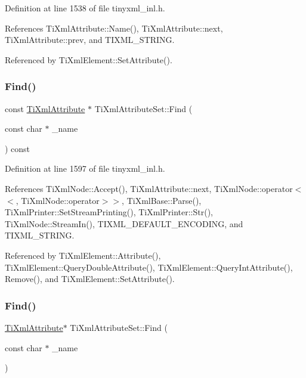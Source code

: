 Definition at line 1538 of file tinyxml\+\_\+inl.\+h.



References Ti\+Xml\+Attribute\+::\+Name(), Ti\+Xml\+Attribute\+::next, Ti\+Xml\+Attribute\+::prev, and T\+I\+X\+M\+L\+\_\+\+S\+T\+R\+I\+NG.



Referenced by Ti\+Xml\+Element\+::\+Set\+Attribute().

\hypertarget{class_ti_xml_attribute_set_a39e9f5ed5ebbf02e059dd39cfa6c5052}{}\label{class_ti_xml_attribute_set_a39e9f5ed5ebbf02e059dd39cfa6c5052} 
\subsubsection{\texorpdfstring{Find()}{Find()}\hspace{0.1cm}{\footnotesize\ttfamily [1/4]}}
{\footnotesize\ttfamily const \hyperlink{class_ti_xml_attribute}{Ti\+Xml\+Attribute} $\ast$ Ti\+Xml\+Attribute\+Set\+::\+Find (\begin{DoxyParamCaption}\item[{const char $\ast$}]{\+\_\+name }\end{DoxyParamCaption}) const}



Definition at line 1597 of file tinyxml\+\_\+inl.\+h.



References Ti\+Xml\+Node\+::\+Accept(), Ti\+Xml\+Attribute\+::next, Ti\+Xml\+Node\+::operator$<$$<$, Ti\+Xml\+Node\+::operator$>$$>$, Ti\+Xml\+Base\+::\+Parse(), Ti\+Xml\+Printer\+::\+Set\+Stream\+Printing(), Ti\+Xml\+Printer\+::\+Str(), Ti\+Xml\+Node\+::\+Stream\+In(), T\+I\+X\+M\+L\+\_\+\+D\+E\+F\+A\+U\+L\+T\+\_\+\+E\+N\+C\+O\+D\+I\+NG, and T\+I\+X\+M\+L\+\_\+\+S\+T\+R\+I\+NG.



Referenced by Ti\+Xml\+Element\+::\+Attribute(), Ti\+Xml\+Element\+::\+Query\+Double\+Attribute(), Ti\+Xml\+Element\+::\+Query\+Int\+Attribute(), Remove(), and Ti\+Xml\+Element\+::\+Set\+Attribute().

\hypertarget{class_ti_xml_attribute_set_a2f210bed54c832adf1683c44c35727b9}{}\label{class_ti_xml_attribute_set_a2f210bed54c832adf1683c44c35727b9} 
\subsubsection{\texorpdfstring{Find()}{Find()}\hspace{0.1cm}{\footnotesize\ttfamily [2/4]}}
{\footnotesize\ttfamily \hyperlink{class_ti_xml_attribute}{Ti\+Xml\+Attribute}$\ast$ Ti\+Xml\+Attribute\+Set\+::\+Find (\begin{DoxyParamCaption}\item[{const char $\ast$}]{\+\_\+name }\end{DoxyParamCaption})\hspace{0.3cm}{\ttfamily [inline]}}



